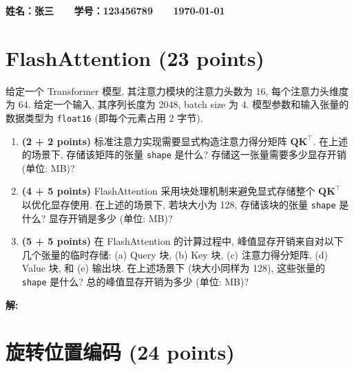 \documentclass[8pt]{article}
\newcommand{\points}[1]{\textbf{(#1 points)}}
\begin{document}
\textbf{\color{blue} \Large 姓名：张三 \ \ \ 学号：123456789 \ \ \ \today}

\section{FlashAttention \points{23}}

{\color{gray}
给定一个 Transformer 模型, 其注意力模块的注意力头数为 16, 每个注意力头维度为 $64$.
给定一个输入, 其序列长度为 2048, batch size 为 4.
模型参数和输入张量的数据类型为 \texttt{float16} (即每个元素占用 2 字节).
\begin{enumerate}
    \item \points{2 + 2} 标准注意力实现需要显式构造注意力得分矩阵 $\mathbf{Q}\mathbf{K}^\top$. 在上述的场景下, 存储该矩阵的张量 \texttt{shape} 是什么? 存储这一张量需要多少显存开销 (单位: MB)? 
    \item \points{4 + 5} FlashAttention 采用块处理机制来避免显式存储整个 $\mathbf{Q} \mathbf{K}^\top$ 以优化显存使用. 在上述的场景下, 若块大小为 128, 存储该块的张量 \texttt{shape} 是什么? 显存开销是多少 (单位: MB)?
    \item \points{5 + 5} 在 FlashAttention 的计算过程中, 峰值显存开销来自对以下几个张量的临时存储: (a) Query 块, (b) Key 块, (c) 注意力得分矩阵, (d) Value 块, 和 (e) 输出块. 在上述场景下 (块大小同样为 128), 这些张量的 \texttt{shape} 是什么? 总的峰值显存开销为多少 (单位: MB)?
\end{enumerate}
}

\textbf{\large 解:}
\vspace{7em}

\section{旋转位置编码 \points{24}}
\label{sec:ii}
\end{document}
